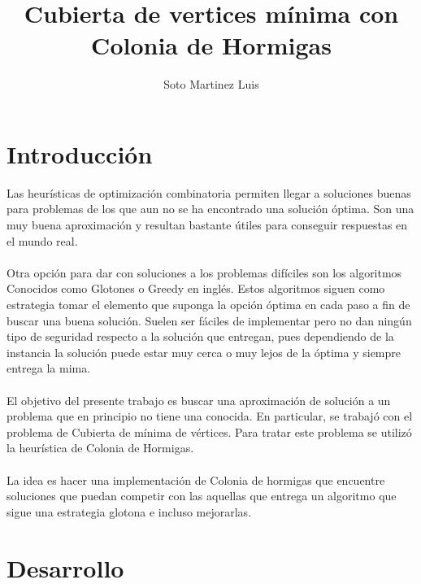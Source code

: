 \documentclass[oneside,12pt]{article}
\begin{document}
\author{Soto Martinez Luis}
\title{Cubierta de vertices mínima con Colonia de Hormigas}
\maketitle


\section{Introducción}

Las heurísticas de optimización combinatoria permiten llegar a soluciones buenas para problemas de los que aun no se ha encontrado una solución óptima. Son una muy buena aproximación y resultan bastante útiles para conseguir respuestas en el mundo real.\\\\
Otra opción para dar con soluciones a los problemas difíciles son los algoritmos Conocidos como Glotones o Greedy en inglés. Estos algoritmos siguen como estrategia tomar el elemento que suponga la opción óptima en cada paso a fin de buscar una buena solución. Suelen ser fáciles de implementar pero no dan ningún tipo de seguridad respecto a la solución que entregan, pues dependiendo de la instancia la solución puede estar muy cerca o muy lejos de la óptima y siempre entrega la mima.\\\\
El objetivo del presente trabajo es buscar una aproximación de solución a un problema que en principio no tiene una conocida. En particular, se trabajó con el problema de Cubierta de mínima de vértices. Para tratar este problema se utilizó la heurística de Colonia de Hormigas.\\\\
La idea es hacer una implementación de Colonia de hormigas que encuentre soluciones que puedan competir con las aquellas que entrega un algoritmo que sigue una estrategia glotona e incluso mejorarlas.\\
\section{Desarrollo} 
\end{document}
